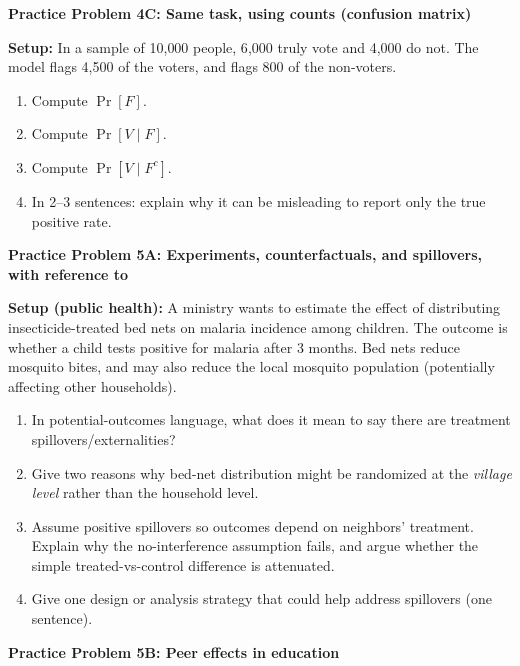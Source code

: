 \documentclass[12pt]{article}
\begin{document}
\noindent\textbf{Practice Problem 4C: Same task, using counts (confusion matrix)}

\noindent \textbf{Setup:} In a sample of 10{,}000 people, 6{,}000 truly vote and 4{,}000 do not.
The model flags 4{,}500 of the voters, and flags 800 of the non-voters.

\begin{enumerate}[label=\arabic*\alph*)]
  \item Compute $\Pr[F]$.
  \item Compute $\Pr[V\mid F]$.
  \item Compute $\Pr[V\mid F^c]$.
  \item In 2--3 sentences: explain why it can be misleading to report only the true positive rate.
\end{enumerate}


\vspace{1.5em}
\noindent\textbf{Practice Problem 5A: Experiments, counterfactuals, and spillovers, with reference to \cite{miguel2004worms}}

\noindent \textbf{Setup (public health):} A ministry wants to estimate the effect of distributing
insecticide-treated bed nets on malaria incidence among children. The outcome is whether a child tests
positive for malaria after 3 months. Bed nets reduce mosquito bites, and may also reduce the local mosquito
population (potentially affecting other households).

\begin{enumerate}[label=\arabic*\alph*)]
  \item In potential-outcomes language, what does it mean to say there are treatment spillovers/externalities?
  \item Give two reasons why bed-net distribution might be randomized at the \emph{village level} rather than the household level.
  \item Assume positive spillovers so outcomes depend on neighbors' treatment. Explain why the no-interference assumption fails,
  and argue whether the simple treated-vs-control difference is attenuated.
  \item Give one design or analysis strategy that could help address spillovers (one sentence).
\end{enumerate}

\vspace{1em}

\noindent\textbf{Practice Problem 5B: Peer effects in education}
\end{document}
